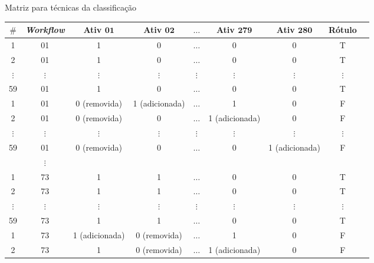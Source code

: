 \begin{frame}		
	\begin{block}{Matriz para técnicas da classificação}
		\begin{table}[!htb]
			\tiny
			\centering
			\begin{tabular}{|c|c|c|c|c|c|c|c|c|}  \hline
				\textbf{\(\#\)} & \textbf{\emph{Workflow}} & \textbf{Ativ \(\mathbf{01}\)} & \textbf{Ativ \(\mathbf{02}\)} & \textbf{\(\mathbf{\ldots}\)}  & \textbf{Ativ \(\mathbf{279}\)} & \textbf{Ativ \(\mathbf{280}\)} & \textbf{Rótulo} \\ \hline
				
				1	&		01		 			   & 1 			  & 0 			  & \(\ldots\) 	  & 0 & 0  			& T	\\ \hline
				2	&		01 					   & 1 			  & 0 			  & \(\ldots\) 	  & 0 & 0  			& T	\\ \hline
				\(\vdots\)  &  \(\vdots\) 	   	   & \(\vdots\)   & \(\vdots\) 	  & \(\vdots\) 	  & \(\vdots\) & \(\vdots\) & \(\vdots\)\\ \hline
				59	&		01 					   & 1 			  & 0 			  & \(\ldots\) 	  & 0 & 0   		& T	\\ \hline
				1	&		01		 			   & 0 (removida) 		  & 1 (adicionada) &\(\ldots\)& 1 & 0	& F	\\ \hline
				2	&		01 					   & 0 (removida)& 0 		  & \(\ldots\) 	  & 1 (adicionada) & 0& F	\\ \hline
				\(\vdots\)  &		\(\vdots\) 	   & \(\vdots\) & \(\vdots\) 	  & \(\vdots\) 	  & \(\vdots\) & \(\vdots\) & \(\vdots\) \\ \hline
				59	&		01 					   & 0 (removida)			  & 0 			  & \(\ldots\) & 0 & 1 (adicionada)& F \\ \hline
				&\(\vdots\) & & & & & & 																		\\ \hline
				1	&		73		 			   & 1 			  & 1  & \(\ldots\) 	  & 0 & 0  			& T	\\ \hline
				2	&		73 					   & 1 			  & 1  & \(\ldots\) 	  & 0 & 0  			& T	\\ \hline
				\(\vdots\)  &		\(\vdots\) 	   & \(\vdots\)   & \(\vdots\) 	  & \(\vdots\) 	  & \(\vdots\) & \(\vdots\) & \(\vdots\) \\ \hline
				59	&		73 					   & 1 			  & 1  & \(\ldots\) 	  & 0 & 0   		& T	\\ \hline
				1	&		73		 			   & 1 (adicionada) & 0 (removida)  & \(\ldots\) 	  & 1 & 0   		& F	\\ \hline
				2	&		73 					   & 1 			  & 0 (removida)  & \(\ldots\)& 1 (adicionada) & 0  & F	\\ \hline

\end{tabular}
\end{table}
\end{block}
\end{frame}
